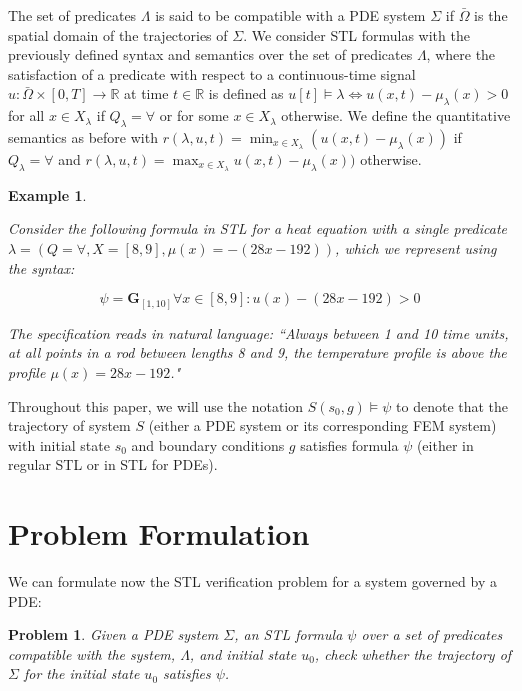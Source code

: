 \documentclass[letterpaper, 10 pt, conference]{ieeeconf/ieeeconf}
\newtheorem{problem}{Problem}
\newtheorem{example}{Example}
\newcommand*{\R}{\mathbb{R}}
\newcommand{\Always}{\mathbf{G}}
\begin{document}
The set of predicates $\Lambda$ is
said to be compatible with a PDE system $\Sigma$ if $\bar\Omega$ is the spatial
domain of the trajectories of $\Sigma$. We consider STL formulas 
with the previously defined syntax and semantics 
over the set of predicates $\Lambda$, where the satisfaction of a
predicate with respect to a continuous-time signal $u : \bar\Omega \times [0, T]
\to \R$ at time $t \in \R$ is defined as $u[t] \models \lambda \iff 
u(x, t) - \mu_\lambda(x) > 0$ for all $x \in X_\lambda$ if $Q_\lambda = \forall$ or for some $x \in
X_\lambda$ otherwise. We define the quantitative semantics as before with
$r(\lambda,u, t) = \min_{x \in X_\lambda} (u(x, t) - \mu_\lambda(x))$ if $Q_\lambda = \forall$ and
$r(\lambda,u, t) = \max_{x \in X_\lambda} u(x, t) - \mu_\lambda(x))$ otherwise.

\begin{example}
    \label{ex:stl}

    Consider the following formula in STL for a heat equation with a single predicate
    $\lambda = (Q = \forall, X = [8, 9], \mu(x) = -(28x - 192))$, which we 
    represent using the syntax:

    \begin{equation}
        \psi = \Always_{[1,10]} \forall x \in [8,9] : u(x) - (28x - 192) > 0
    \end{equation}

    The specification reads in natural language: ``Always between 1 and 10 time
    units, at all points in a rod between lengths 8 and 9, the temperature
    profile is above the profile $\mu(x) = 28x - 192$."

\end{example}

Throughout this paper, we will use the notation $S(s_0, g) \models \psi$ to denote
that the trajectory of system $S$ (either a PDE system or its corresponding FEM
system) with initial state $s_0$ and boundary conditions $g$ satisfies formula 
$\psi$ (either in regular STL or in STL for PDEs).

\section{Problem Formulation}
\label{sec:problem_formulation}

We can formulate now the STL verification problem for a system governed by a
PDE:

\begin{problem}
\label{pr:stl}
    Given a PDE system $\Sigma$, an STL formula $\psi$ over a set of predicates
    compatible with the system, $\Lambda$, and initial state $u_0$,
    check whether the trajectory of $\Sigma$ for the initial state $u_0$
    satisfies $\psi$.
\end{problem}
\end{document}
